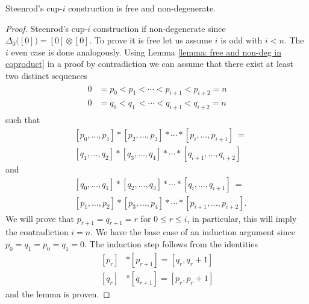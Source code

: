 \begin{proposition}
	Steenrod's cup-$i$ construction is free and non-degenerate.
\end{proposition}

\begin{proof}
	Steenrod's cup-$i$ construction if non-degenerate since $\Delta_0\big([0]\big) = [0] \otimes [0]$. To prove it is free let us assume $i$ is odd with $i < n$. The $i$ even case is done analogously. Using Lemma \ref{lemma: free and non-deg in coproduct} in a proof by contradiction we can assume that there exist at least two distinct sequences
	\begin{align*}
	\begin{split}
	0 &= p_0 < p_1   < \cdots < p_{i+1} < p_{i+2} = n \\
	0 &= q_0 < q_1 \,<  \cdots < q_{i+1} < q_{i+2} = n
	\end{split}
	\end{align*}
	such that
	\[
	\begin{split}
	&[ {p_0}, \dots, {p_1} ] \ast [ {p_2}, \dots, {p_3} ] \ast \cdots \ast [ {p_{i}}, \dots, {p_{i+1}} ]\ = \\
	&[ {q_1}, \dots, {q_2} ] \ast [ {q_3}, \dots, {q_4} ] \ast \cdots \ast [ {q_{i+1}}, \dots, {q_{i+2}} ]
	\end{split}
	\]
	and
	\[
	\begin{split}
	&[ {q_0}, \dots, {q_1} ] \ast [ {q_2}, \dots, {q_3} ] \ast \cdots \ast [ {q_{i}}, \dots, {q_{i+1}} ]\ = \\
	&[ {p_1}, \dots, {p_2} ] \ast [ {p_3}, \dots, {p_4} ] \ast \cdots \ast [ {p_{i+1}}, \dots, {p_{i+2}} ].
	\end{split}
	\]
	We will prove that $p_{r+1} = q_{r+1} = r$ for $0 \leq r \leq i$, in particular, this will imply the contradiction $i = n$. We have the base case of an induction argument since ${p_0} = {q_1} = {p_0} = {q_1} = 0$. The induction step follows from the identities
	\[
	\begin{split}
	[p_r] &\ast [p_{r+1}] = [q_r, q_{r}+1]\\
	[q_r] &\ast [q_{r+1}] = [p_r, p_{r}+1]
	\end{split}
	\]
	and the lemma is proven.
\end{proof}